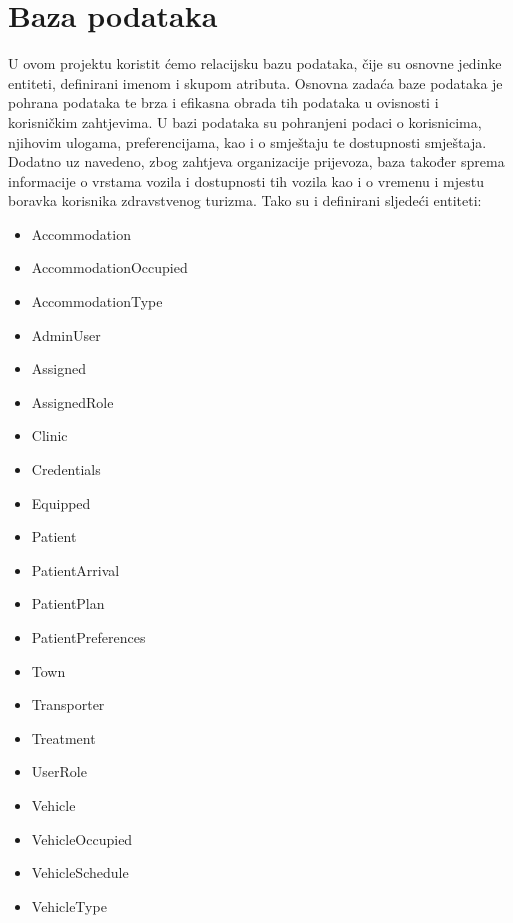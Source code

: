 		

				
		\section{Baza podataka}
			
			
			U ovom projektu koristit ćemo relacijsku bazu podataka, čije su osnovne jedinke entiteti, definirani imenom i skupom atributa. Osnovna zadaća baze podataka je pohrana podataka te brza i efikasna obrada tih podataka u ovisnosti i korisničkim zahtjevima. U bazi podataka su pohranjeni podaci o korisnicima, njihovim ulogama, preferencijama, kao i o smještaju te dostupnosti smještaja. Dodatno uz navedeno, zbog zahtjeva organizacije prijevoza, baza također sprema informacije o vrstama vozila i dostupnosti tih vozila kao i o vremenu i mjestu boravka korisnika zdravstvenog turizma. Tako su i definirani sljedeći entiteti:
			\begin{multicols}{2}
				\begin{itemize}
					\item Accommodation
					\item AccommodationOccupied
					\item AccommodationType
					\item AdminUser
					\item Assigned
					\item AssignedRole
					\item Clinic
					\item Credentials
					\item Equipped
					\item Patient
					\item PatientArrival
					\item PatientPlan
					\item PatientPreferences
					\item Town
					\item Transporter
					\item Treatment
					\item UserRole
					\item Vehicle
					\item VehicleOccupied
					\item VehicleSchedule
					\item VehicleType
				\end{itemize}
			\end{multicols}
		
